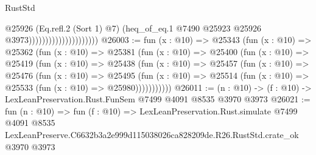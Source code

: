 \begin{lexlean}{RustStd}
\begin{coremodule}
                                            @25926
                                            (Eq.refl.{2} (Sort 1) @7)
                                            (heq_of_eq.{1}
                                              @7490
                                              @25923
                                              @25926
                                              @3973)))))))))))))))))))))
@26003 := fun (x : @10) =>
  @25343
    (fun (x : @10) =>
    @25362
      (fun (x : @10) =>
      @25381
        (fun (x : @10) =>
        @25400
          (fun (x : @10) =>
          @25419
            (fun (x : @10) =>
            @25438
              (fun (x : @10) =>
              @25457
                (fun (x : @10) =>
                @25476
                  (fun (x : @10) =>
                  @25495
                    (fun (x : @10) =>
                    @25514 (fun (x : @10) => @25533 (fun (x : @10) => @25980)))))))))))
@26011 := (n : @10) -> (f : @10) -> LexLeanPreservation.Rust.FunSem @7499 @4091 @8535 @3970 @3973
@26021 := fun (n : @10) =>
  fun (f : @10) =>
  LexLeanPreservation.Rust.simulate
    @7499
    @4091
    @8535
    LexLeanPreserve.C6632b3a2e999d115038026ca828209de.R26.RustStd.crate_ok
    @3970
    @3973
\end{coremodule}
\end{lexlean}
